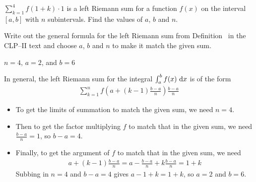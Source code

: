 
\begin{question}[M105 2015A]
$\displaystyle \sum_{k=1}^4 f(1+k)\cdot 1$ is a left Riemann sum for a function $f(x)$ on the interval $[a,b]$ with $n$ subintervals. Find the values of $a$, $b$ and $n$.
\end{question}

\begin{hint}
Write out the general formula for the left Riemann sum from Definition~ in the CLP--II text and
choose $a$, $b$ and $n$ to make it match the given sum.
\end{hint}

\begin{answer}
$n=4$, $a=2$, and $b=6$
\end{answer}

\begin{solution}
In general, the {left} Riemann sum for the integral $\int_a^b f(x)\,\,\mathrm{d}x$
is of the form
\begin{align*}
\sum_{k=1}^n f\left(a+(k-1)\frac{b-a}{n}\right)\frac{b-a}{n}
\end{align*}

\begin{itemize}
\item
To get the limits of summation to match the given sum, we need $n=4$.
\item
Then to get the factor multiplying $f$ to match that in the given sum,
we need $\frac{b-a}{n}=1$, so $b-a=4$.
\item Finally, to get the argument of $f$ to match that in the given sum,
we need
\begin{align*}
a+(k-1)\frac{b-a}{n}=a-\frac{b-a}{n} +k\frac{b-a}{n}=1+k
\end{align*}
Subbing in $n=4$ and $b-a=4$ gives
$a-1 +k=1+k$, so $a=2$ and $b=6$.
\end{itemize}
\end{solution}



